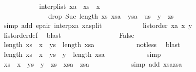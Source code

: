 \begin{isabellebody}
\ \ \ \ \ \ \ \ \isamarkupfalse%
\ \isamarkupfalse%
\ {\isachardoublequoteopen}interp{\isacharunderscore}list\ xa\ {\isacharequal}\ xs\ {\isacharat}\ {\isacharbrackleft}x{\isacharbrackright}\ {\isacharat}\isanewline
\ \ \ \ \ \ \ \ \ \ \ \ \ \ {\isacharparenleft}{\isacharparenleft}drop\ {\isacharparenleft}Suc\ {\isacharparenleft}length\ xs{\isacharparenright}{\isacharparenright}\ xsa{\isacharparenright}\ {\isacharat}\ ysa\ {\isacharat}\ us{\isacharparenright}\ {\isacharat}\ {\isacharbrackleft}y{\isacharbrackright}\ {\isacharat}\ zs{\isachardoublequoteclose}\isanewline
\ \ \ \ \ \ \ \ \ \ \isamarkupfalse%
\ {\isacharparenleft}simp\ add{\isacharcolon}\ e{\isacharunderscore}pair\ interp{\isacharunderscore}xa\ xa{\isacharunderscore}split{\isacharparenright}\isanewline
\ \ \ \ \ \ \ \ \isamarkupfalse%
\ \isamarkupfalse%
\ {\isachardoublequoteopen}list{\isacharunderscore}order\ xa\ x\ y{\isachardoublequoteclose}\isanewline
\ \ \ \ \ \ \ \ \ \ \isamarkupfalse%
\ list{\isacharunderscore}order{\isacharunderscore}def\ \isamarkupfalse%
\ blast\isanewline
\ \ \ \ \ \ \isamarkupfalse%
\isanewline
\ \ \ \ \ \ \ \ \isamarkupfalse%
\ False\isanewline
\ \ \ \ \ \ \ \ \isamarkupfalse%
\ {\isachardoublequoteopen}length\ {\isacharparenleft}xs\ {\isacharat}\ x\ {\isacharhash}\ ys{\isacharparenright}\ {\isacharless}\ length\ xsa{\isachardoublequoteclose}\isanewline
\ \ \ \ \ \ \ \ \ \ \isamarkupfalse%
\ not{\isacharunderscore}less\ \isamarkupfalse%
\ blast\isanewline
\ \ \ \ \ \ \ \ \isamarkupfalse%
\ {\isachardoublequoteopen}length\ {\isacharparenleft}xs\ {\isacharat}\ x\ {\isacharhash}\ ys\ {\isacharat}\ {\isacharbrackleft}y{\isacharbrackright}{\isacharparenright}\ {\isasymle}\ length\ xsa{\isachardoublequoteclose}\isanewline
\ \ \ \ \ \ \ \ \ \ \isamarkupfalse%
\ simp\isanewline
\ \ \ \ \ \ \ \ \isamarkupfalse%
\ \isamarkupfalse%
\ {\isachardoublequoteopen}{\isacharparenleft}xs\ {\isacharat}\ x\ {\isacharhash}\ ys\ {\isacharat}\ {\isacharbrackleft}y{\isacharbrackright}{\isacharparenright}\ {\isacharat}\ zs\ {\isacharequal}\ xsa\ {\isacharat}\ zsa{\isachardoublequoteclose}\isanewline
\ \ \ \ \ \ \ \ \ \ \isamarkupfalse%
\ {\isacharparenleft}simp\ add{\isacharcolon}\ xsa{\isacharunderscore}zsa{\isacharparenright}\isanewline
\ \ \ \ \ \ \ \ \isamarkupfalse%
\ \isamarkupfalse%

\end{isabellebody}
